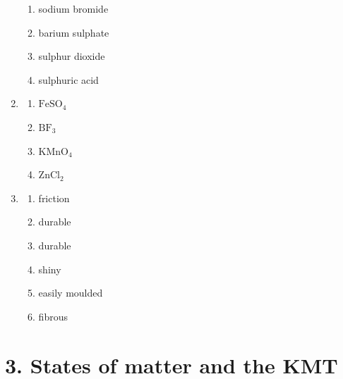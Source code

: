 \begin{multicols}{3}
\begin{enumerate}[itemsep=5pt, label=\textbf{\arabic*}. ]
\begin{enumerate}[itemsep=5pt,label=\textbf{(\alph*)}]
 \item sodium bromide
 \item barium sulphate
 \item sulphur dioxide
 \item sulphuric acid
\end{enumerate}
\item %
\begin{enumerate}[itemsep=5pt,label=\textbf{(\alph*)}]
 \item $\text{FeSO}_{4}$
 \item $\text{BF}_{3}$
 \item $\text{KMnO}_{4}$
 \item $\text{ZnCl}_{2}$
\end{enumerate}
\item %
\begin{enumerate}[itemsep=5pt,label=\textbf{(\alph*)}]
 \item friction
 \item durable
 \item durable
 \item shiny
 \item easily moulded
 \item fibrous
\end{enumerate}
\end{enumerate}
\end{multicols}

\section {3. States of matter and the KMT}

